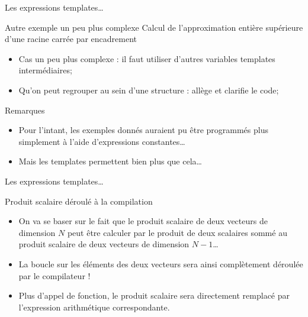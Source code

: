 \documentclass[handout,10pt]{beamer}
\newcommand{\includepartcode}[4][cpp]{

}
\begin{document}
\begin{frame}[fragile]{Les expressions templates\ldots}
\tiny
\begin{exampleblock}{Autre exemple un peu plus complexe}
Calcul de l'approximation entière supérieure d'une racine carrée par encadrement
\begin{itemize}
\item Cas un peu plus complexe : il faut utiliser d'autres variables templates intermédiaires;
\item Qu'on peut regrouper au sein d'une structure : allège et clarifie le code;
\end{itemize}
\includepartcode{iroot_template.cpp}{3}{14}
\end{exampleblock}

\begin{alertblock}{Remarques}
\begin{itemize}
\item Pour l'intant, les exemples donnés auraient pu être programmés plus simplement à l'aide d'expressions constantes\ldots
\item Mais les templates permettent bien plus que cela\ldots
\end{itemize}
\end{alertblock}
\end{frame}

\begin{frame}[fragile]{Les expressions templates\ldots}
\tiny
\begin{exampleblock}{Produit scalaire déroulé à la compilation}
\begin{itemize}
\item On va se baser sur le fait que le produit scalaire de deux vecteurs de dimension $N$ peut être calculer par le produit de deux scalaires sommé au produit scalaire de deux vecteurs de dimension $N-1$\ldots
\item La boucle sur les éléments des deux vecteurs sera ainsi complètement déroulée par le compilateur !
\item Plus d'appel de fonction, le produit scalaire sera directement remplacé par l'expression arithmétique correspondante.
\end{itemize}
\includepartcode{dotproduct_expr_template.cpp}{6}{26}
\end{exampleblock}
\end{frame}
\end{document}
